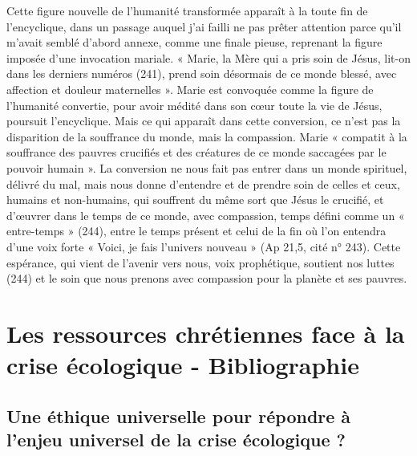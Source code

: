        \begin{singlequote}
Cette figure nouvelle de l’humanité transformée apparaît à la toute fin de l’encyclique, dans un passage auquel j’ai failli ne pas prêter attention parce qu’il m’avait semblé d’abord annexe, comme une finale pieuse, reprenant la figure imposée d’une invocation mariale. « Marie, la Mère qui a pris soin de Jésus, lit-on dans les derniers numéros (241), prend soin désormais de ce monde blessé, avec affection et douleur maternelles ». Marie est convoquée comme la figure de l’humanité convertie, pour avoir médité dans son cœur toute la vie de Jésus, poursuit l’encyclique. Mais ce qui apparaît dans cette conversion, ce n’est pas la disparition de la souffrance du monde, mais la compassion. Marie « compatit à la souffrance des pauvres crucifiés et des créatures de ce monde saccagées par le pouvoir humain ». La conversion ne nous fait pas entrer dans un monde spirituel, délivré du mal, mais nous donne d’entendre et de prendre soin de celles et ceux, humains et non-humains, qui souffrent du même sort que Jésus le crucifié, et d’œuvrer dans le temps de ce monde, avec compassion, temps défini comme un « entre-temps » (244), entre le temps présent et celui de la fin où l’on entendra d’une voix forte « Voici, je fais l’univers nouveau » (Ap 21,5, cité n° 243). Cette espérance, qui vient de l’avenir vers nous, voix prophétique, soutient nos luttes (244) et le soin que nous prenons avec compassion pour la planète et ses pauvres. \cite[par. 12]{goujon_laudato_2022}
\end{singlequote}


 


\section{Les ressources chrétiennes face à la crise écologique - Bibliographie}

\subsection{Une éthique universelle pour répondre à l'enjeu universel de la crise écologique ?}

